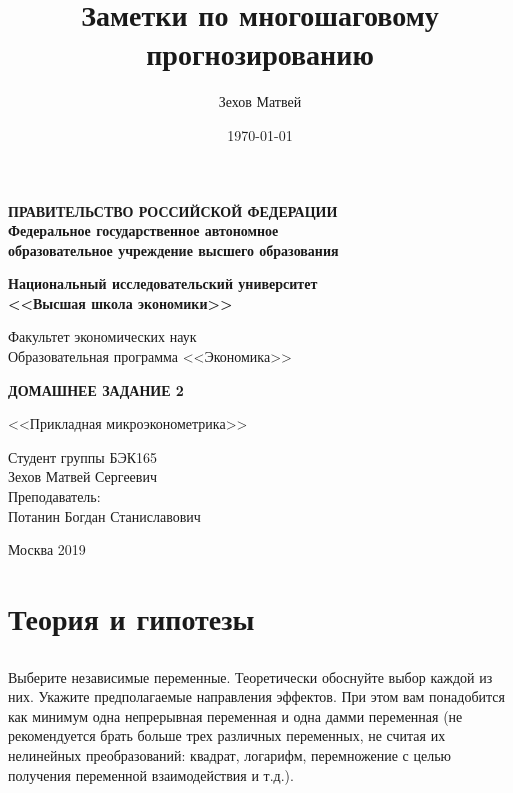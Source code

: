 \documentclass[a4paper,12pt]{article}
\author{Зехов Матвей}
\title{Заметки по многошаговому прогнозированию}
\date{\today}
\begin{document}
	\newpage
\thispagestyle{empty}
\begin{center}
	\textbf{ПРАВИТЕЛЬСТВО РОССИЙСКОЙ ФЕДЕРАЦИИ}\\
	\vspace{2ex}
	\textbf{Федеральное государственное автономное\\ образовательное учреждение высшего образования}
	
	\vspace{2ex}
	
	\textbf{Национальный исследовательский университет \\ <<Высшая школа экономики>>}
	
	\vspace{8ex}
	\begin{flushright}
		Факультет экономических наук\\
		Образовательная программа <<Экономика>>
	\end{flushright}
\end{center}
\vspace{9ex}

\begin{center}
	{\textbf{ДОМАШНЕЕ ЗАДАНИЕ 2
	}}
	\vspace{1ex}
	
	<<Прикладная микроэконометрика>>
\end{center}
\vspace{1ex}
\begin{flushright}
	\noindent
	Студент группы БЭК165\\Зехов Матвей Сергеевич\\
	\vspace{13ex}
	Преподаватель:\\
	Потанин Богдан Станиславович
	
\end{flushright}	

\vfill

\begin{center}
	Москва 2019
	
\end{center}

\newpage
	\tableofcontents
	
\newpage
\section{Теория и гипотезы}
\subsection{}
\Sun 
Выберите независимые переменные. Теоретически обоснуйте выбор каждой из
них. Укажите предполагаемые направления эффектов. При этом вам понадобится как
минимум одна непрерывная переменная и одна дамми переменная (не рекомендуется
брать больше трех различных переменных, не считая их нелинейных преобразований:
квадрат, логарифм, перемножение с целью получения переменной взаимодействия и т.д.).
\end{document}
